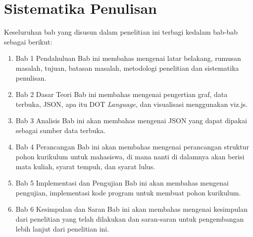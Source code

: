 \section{Sistematika Penulisan}
\label{sec:Sistematika Penulisan}
Keseluruhan bab yang disusun dalam penelitian ini terbagi kedalam bab-bab sebagai berikut:
\begin{enumerate}
\item Bab 1 Pendahuluan
Bab ini membahas mengenai latar belakang, rumusan masalah, tujuan, batasan masalah,
metodologi penelitian dan sistematika penulisan.
\item Bab 2 Dasar Teori
Bab ini membahas mengenai pengertian graf, data terbuka, JSON, apa itu DOT \textit{Language}, dan visualisasi menggunakan viz.js.
\item Bab 3 Analisis 
Bab ini akan membahas mengenai JSON yang dapat dipakai sebagai sumber data terbuka.
\item Bab 4 Perancangan 
Bab ini akan membahas mengenai perancangan struktur pohon kurikulum untuk mahasiswa, di mana nanti di dalamnya akan berisi mata kuliah, syarat tempuh, dan syarat lulus. 
\item Bab 5 Implementasi dan Pengujian
Bab ini akan membahas mengenai pengujian, implementasi kode program untuk membuat pohon kurikulum.
\item Bab 6 Kesimpulan dan Saran
Bab ini akan membahas mengenai kesimpulan dari penelitian yang telah dilakukan dan
saran-saran untuk pengembangan lebih lanjut dari penelitian ini.
\end{enumerate}